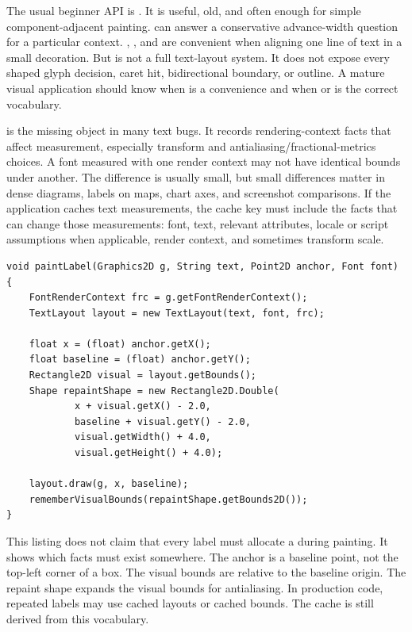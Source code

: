 The usual beginner API is . It is useful, old, and often enough for simple component-adjacent painting.  can answer a conservative advance-width question for a particular  context. , , and  are convenient when aligning one line of text in a small decoration. But  is not a full text-layout system. It does not expose every shaped glyph decision, caret hit, bidirectional boundary, or outline. A mature visual application should know when  is a convenience and when  or  is the correct vocabulary.

 is the missing object in many text bugs. It records rendering-context facts that affect measurement, especially transform and antialiasing/fractional-metrics choices. A font measured with one render context may not have identical bounds under another. The difference is usually small, but small differences matter in dense diagrams, labels on maps, chart axes, and screenshot comparisons. If the application caches text measurements, the cache key must include the facts that can change those measurements: font, text, relevant attributes, locale or script assumptions when applicable, render context, and sometimes transform scale.

\begin{lstlisting}[caption={Choosing measurement vocabulary deliberately.}]
void paintLabel(Graphics2D g, String text, Point2D anchor, Font font) {
    FontRenderContext frc = g.getFontRenderContext();
    TextLayout layout = new TextLayout(text, font, frc);

    float x = (float) anchor.getX();
    float baseline = (float) anchor.getY();
    Rectangle2D visual = layout.getBounds();
    Shape repaintShape = new Rectangle2D.Double(
            x + visual.getX() - 2.0,
            baseline + visual.getY() - 2.0,
            visual.getWidth() + 4.0,
            visual.getHeight() + 4.0);

    layout.draw(g, x, baseline);
    rememberVisualBounds(repaintShape.getBounds2D());
}
\end{lstlisting}

This listing does not claim that every label must allocate a  during painting. It shows which facts must exist somewhere. The anchor is a baseline point, not the top-left corner of a box. The visual bounds are relative to the baseline origin. The repaint shape expands the visual bounds for antialiasing. In production code, repeated labels may use cached layouts or cached bounds. The cache is still derived from this vocabulary.


